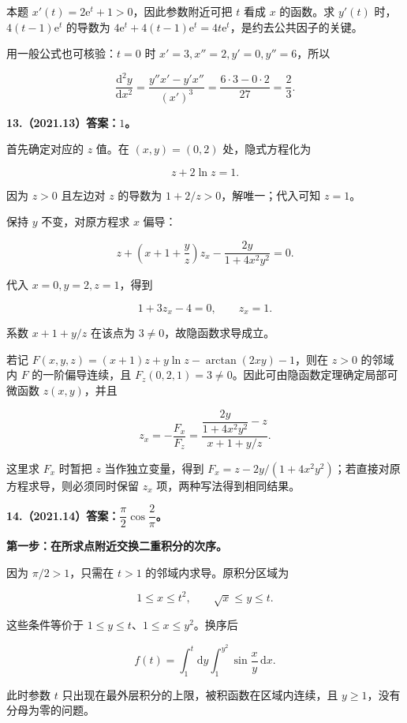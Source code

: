 \documentclass[UTF8,11pt,fontset=windows]{ctexart}
\begin{document}
本题 $x'(t)=2\mathrm e^t+1>0$，因此参数附近可把 $t$ 看成 $x$ 的函数。求 $y'(t)$ 时，$4(t-1)\mathrm e^t$ 的导数为 $4\mathrm e^t+4(t-1)\mathrm e^t=4t\mathrm e^t$，是约去公共因子的关键。

用一般公式也可核验：$t=0$ 时 $x'=3,x''=2,y'=0,y''=6$，所以

$$
\frac{\mathrm d^2y}{\mathrm dx^2}
=\frac{y''x'-y'x''}{(x')^3}
=\frac{6\cdot3-0\cdot2}{27}=\frac23.
$$

\clearpage

\textbf{13.（2021.13）答案：$1$。}

首先确定对应的 $z$ 值。在 $(x,y)=(0,2)$ 处，隐式方程化为

$$
z+2\ln z=1.
$$

因为 $z>0$ 且左边对 $z$ 的导数为 $1+2/z>0$，解唯一；代入可知 $z=1$。

保持 $y$ 不变，对原方程求 $x$ 偏导：

$$
z+\left(x+1+\frac yz\right)z_x
-\frac{2y}{1+4x^2y^2}=0.
$$

代入 $x=0,y=2,z=1$，得到

$$
1+3z_x-4=0,
\qquad z_x=1.
$$

系数 $x+1+y/z$ 在该点为 $3\ne0$，故隐函数求导成立。

若记 $F(x,y,z)=(x+1)z+y\ln z-\arctan(2xy)-1$，则在 $z>0$ 的邻域内 $F$ 的一阶偏导连续，且 $F_z(0,2,1)=3\ne0$。因此可由隐函数定理确定局部可微函数 $z(x,y)$，并且

$$
z_x=-\frac{F_x}{F_z}
=\frac{\dfrac{2y}{1+4x^2y^2}-z}{x+1+y/z}.
$$

这里求 $F_x$ 时暂把 $z$ 当作独立变量，得到 $F_x=z-2y/(1+4x^2y^2)$；若直接对原方程求导，则必须同时保留 $z_x$ 项，两种写法得到相同结果。

\clearpage

\textbf{14.（2021.14）答案：$\dfrac\pi2\cos\dfrac2\pi$。}

\textbf{第一步：在所求点附近交换二重积分的次序。}

因为 $\pi/2>1$，只需在 $t>1$ 的邻域内求导。原积分区域为

$$
1\le x\le t^2,\qquad \sqrt x\le y\le t.
$$

这些条件等价于 $1\le y\le t$、$1\le x\le y^2$。换序后

$$
f(t)=\int_1^t\mathrm dy\int_1^{y^2}\sin\frac xy\,\mathrm dx.
$$

此时参数 $t$ 只出现在最外层积分的上限，被积函数在区域内连续，且 $y\ge1$，没有分母为零的问题。
\end{document}
